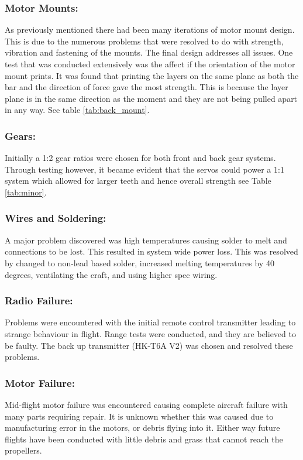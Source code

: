 \subsubsection*{Motor Mounts:} As previously mentioned there had been many iterations of motor mount design. This is due to the numerous problems that were resolved to do with strength, vibration and fastening of the mounts. The final design addresses all issues. One test that was conducted extensively was the affect if the orientation of the motor mount prints. It was found that printing the layers on the same plane as both the bar and the direction of force gave the most strength. This is because the layer plane is in the same direction as the moment and they are not being pulled apart in any way. See table \ref{tab:back_mount}.

\subsubsection*{Gears:} Initially a 1:2 gear ratios were chosen for both front and back gear systems. Through testing however, it became evident that the servos could power a 1:1 system which allowed for larger teeth and hence overall strength see Table \ref{tab:minor}.

\subsubsection*{Wires and Soldering:}  A major problem discovered was high temperatures causing solder to melt and connections to be lost. This resulted in system wide power loss. This was resolved by changed to non-lead based solder, increased melting temperatures by 40 degrees, ventilating the craft, and using higher spec wiring. 

\subsubsection*{Radio Failure:} Problems were encountered with the initial remote control  transmitter leading to strange behaviour in flight. Range tests were conducted, and they are believed to be faulty. The back up transmitter (HK-T6A V2) was chosen and resolved these problems.

\subsubsection*{Motor Failure:} Mid-flight motor failure was encountered causing complete aircraft failure with many parts requiring repair. It is unknown whether this was caused due to manufacturing error in the motors, or debris flying into it. Either way future flights have been conducted with little debris and grass that cannot reach the propellers. 

